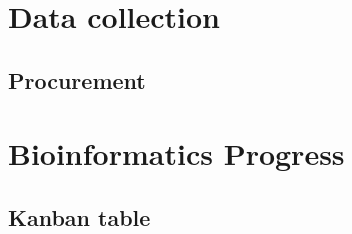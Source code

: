 \documentclass[11pt]{report}
\begin{document}
\chapter{Data collection}

\section{Procurement}


\newpage
		
\chapter{Bioinformatics Progress}

\section{Kanban table}
\end{document}

